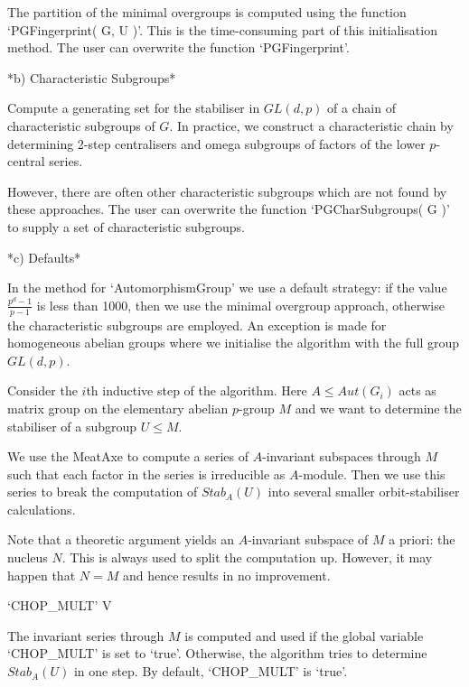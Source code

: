 The partition of the minimal overgroups is computed using the
function `PGFingerprint( G, U )'. This is the time-consuming
part of this initialisation method. The user can 
overwrite the function `PGFingerprint'.

*b) Characteristic  Subgroups*

Compute  a  generating   set  for  the stabiliser in  $GL (d, p)$ of  
a chain of  characteristic subgroups of $G$. In  practice, we construct 
a characteristic  chain by determining 2-step  centralisers  and omega  
subgroups  of  factors  of the  lower $p$-central series.  

However, there are often other characteristic subgroups which are not
found by these approaches. The user can overwrite the function
`PGCharSubgroups( G )' to supply a set of characteristic subgroups.

*c) Defaults*

In the method for `AutomorphismGroup' we use a default strategy:
if the value $\frac{p^d-1}{p-1}$ is less than 1000, then we 
use the minimal overgroup approach, otherwise the characteristic 
subgroups are employed. An exception is made for homogeneous abelian
groups where we initialise the algorithm with the full group $GL(d,p)$.


Consider the $i$th inductive step of the algorithm. Here $A \leq
Aut(G_i)$ acts as matrix group on the elementary abelian $p$-group
$M$ and we want to determine the stabiliser of a subgroup $U \leq M$.

We use the MeatAxe to compute a series of $A$-invariant subspaces
through $M$ such that each factor in the series is irreducible as
$A$-module. Then we use this series to break the computation 
of $Stab_A(U)$ into several smaller orbit-stabiliser calculations.

Note that a theoretic argument yields an $A$-invariant subspace
of $M$ a priori: the nucleus $N$. This is always used to split
the computation up. However, it may happen that $N = M$ and hence
results in no improvement. 

\>`CHOP_MULT' V

The invariant series through $M$ is computed and used if the 
global variable `CHOP_MULT' is set to `true'. Otherwise, the algorithm
tries to determine $Stab_A(U)$ in one step. By default, `CHOP_MULT'
is `true'.


